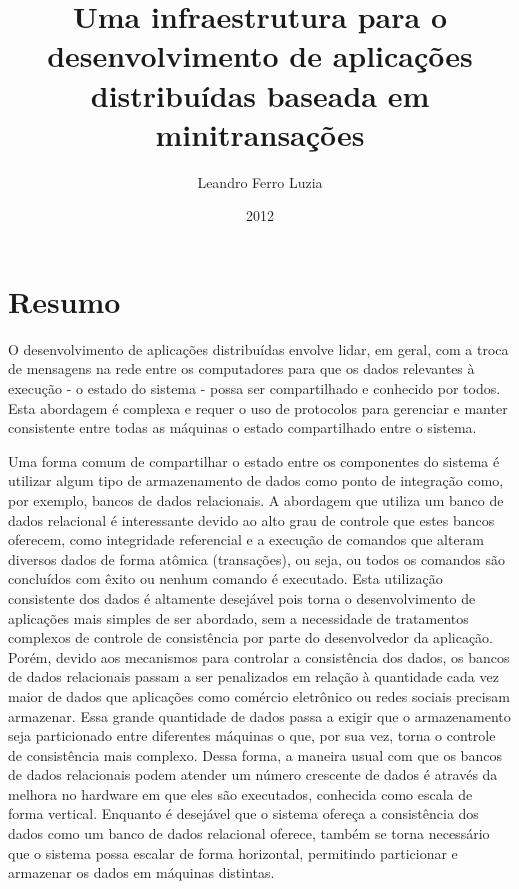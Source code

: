 \documentclass[11pt,twoside,a4paper]{book}
\title{Uma infraestrutura para o desenvolvimento de aplicações distribuídas baseada em minitransações}
\author{Leandro Ferro Luzia}
\date{2012}
\begin{document}
\pagestyle{headings}
\maketitle
\section*{Resumo}
O desenvolvimento de aplicações distribuídas envolve lidar, em geral, com a troca de mensagens na rede entre os computadores para que os dados relevantes à execução - o estado do sistema - possa ser compartilhado e conhecido por todos. Esta abordagem é complexa e requer o uso de protocolos para gerenciar e manter consistente entre todas as máquinas o estado compartilhado entre o sistema.

Uma forma comum de compartilhar o estado entre os componentes do sistema é utilizar algum tipo de armazenamento de dados como ponto de integração como, por exemplo, bancos de dados relacionais. A abordagem que utiliza um banco de dados relacional é interessante devido ao alto grau de controle que estes bancos oferecem, como integridade referencial e a execução de comandos que alteram diversos dados de forma atômica (transações), ou seja, ou todos os comandos são concluídos com êxito ou nenhum comando é executado. Esta utilização consistente dos dados é altamente desejável pois torna o desenvolvimento de aplicações mais simples de ser abordado, sem a necessidade de tratamentos complexos de controle de consistência por parte do desenvolvedor da aplicação. Porém, devido aos mecanismos para controlar a consistência dos dados, os bancos de dados relacionais passam a ser penalizados em relação à quantidade cada vez maior de dados que aplicações como comércio eletrônico ou redes sociais precisam armazenar. Essa grande quantidade de dados passa a exigir que o armazenamento seja particionado entre diferentes máquinas o que, por sua vez, torna o controle de consistência mais complexo. Dessa forma, a maneira usual com que os bancos de dados relacionais podem atender um número crescente de dados é através da melhora no hardware em que eles são executados, conhecida como escala de forma vertical. Enquanto é desejável que o sistema ofereça a consistência dos dados como um banco de dados relacional oferece, também se torna necessário que o sistema possa escalar de forma horizontal, permitindo particionar e armazenar os dados em máquinas distintas. 
\end{document}
